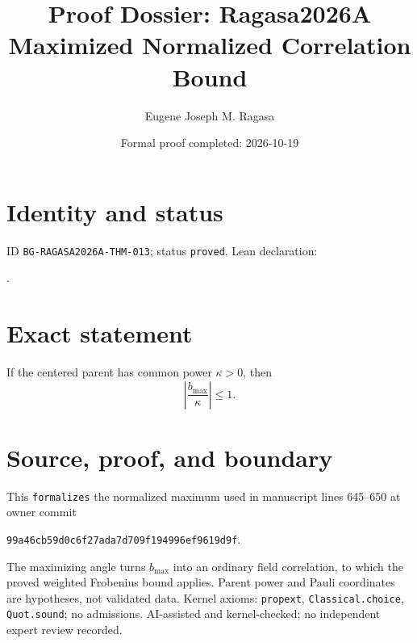 \documentclass[11pt]{article}
\title{Proof Dossier: Ragasa2026A Maximized Normalized Correlation Bound}\author{Eugene Joseph M. Ragasa}\date{Formal proof completed: 2026-10-19}
\begin{document}
\maketitle
\section{Identity and status}
ID \texttt{BG-RAGASA2026A-THM-013}; status \texttt{proved}. Lean declaration:
\par{}.
\section{Exact statement}
If the centered parent has common power $\kappa>0$, then
\[\left|\frac{b_{\max}}{\kappa}\right|\le1.\]
\section{Source, proof, and boundary}
This \texttt{formalizes} the normalized maximum used in manuscript lines 645--650 at owner
commit
\begin{center}\small\texttt{99a46cb59d0c6f27ada7d709f194996ef9619d9f}.\end{center}
The maximizing
angle turns $b_{\max}$ into an ordinary field correlation, to which the proved weighted
Frobenius bound applies. Parent power and Pauli coordinates are hypotheses, not validated
data. Kernel axioms: \texttt{propext}, \texttt{Classical.choice}, \texttt{Quot.sound};
no admissions. AI-assisted and kernel-checked; no independent expert review recorded.
\end{document}

